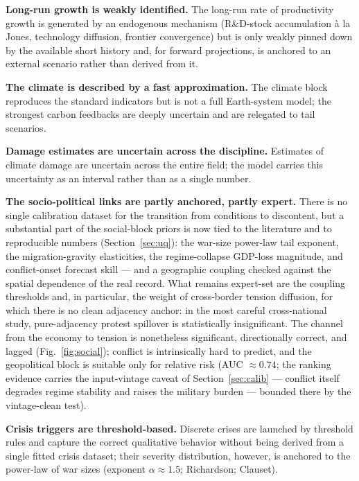 \documentclass[a4paper,fleqn]{cas-sc}
\begin{document}
\textbf{Long-run growth is weakly identified.} The long-run rate of productivity growth is generated
by an endogenous mechanism (R\&D-stock accumulation à la Jones, technology diffusion, frontier
convergence) but is only weakly pinned down by the available short history and, for forward
projections, is anchored to an external scenario rather than derived from it.

\textbf{The climate is described by a fast approximation.} The climate block reproduces the standard
indicators but is not a full Earth-system model; the strongest carbon feedbacks are deeply uncertain
and are relegated to tail scenarios.

\textbf{Damage estimates are uncertain across the discipline.} Estimates of climate damage are
uncertain across the entire field; the model carries this uncertainty as an interval rather than as
a single number.

\textbf{The socio-political links are partly anchored, partly expert.} There is no single calibration
dataset for the transition from conditions to discontent, but a substantial part of the social-block
priors is now tied to the literature and to reproducible numbers (Section~\ref{sec:uq}): the war-size
power-law tail exponent, the migration-gravity elasticities, the regime-collapse GDP-loss magnitude,
and conflict-onset forecast skill --- and a geographic coupling checked against the spatial dependence
of the real record. What remains expert-set are the coupling thresholds and, in particular, the weight
of cross-border tension diffusion, for which there is no clean adjacency anchor: in the most careful
cross-national study, pure-adjacency protest spillover is statistically insignificant. The channel from
the economy to tension is nonetheless significant, directionally correct, and lagged
(Fig.~\ref{fig:social}); conflict is intrinsically hard to predict, and the geopolitical block is
suitable only for relative risk (AUC ${\approx}0.74$; the ranking evidence carries the
input-vintage caveat of Section~\ref{sec:calib} --- conflict itself degrades regime
stability and raises the military burden --- bounded there by the vintage-clean test).

\textbf{Crisis triggers are threshold-based.} Discrete crises are launched by threshold rules and
capture the correct qualitative behavior without being derived from a single fitted crisis dataset;
their severity distribution, however, is anchored to the power-law of war sizes (exponent
${\alpha}{\approx}1.5$; Richardson; Clauset).
\end{document}
